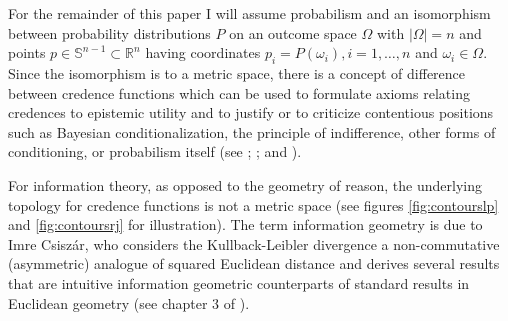 \documentclass[smallextended]{svjour3}       %
\begin{document}
For the remainder of this paper I will assume probabilism and an
isomorphism between probability distributions $P$ on an outcome space
$\Omega$ with $|\Omega|=n$ and points
$p\in\mathbb{S}^{n-1}\subset\mathbb{R}^{n}$ having coordinates
$p_{i}=P(\omega_{i}),i=1,\ldots,n$ and $\omega_{i}\in{}\Omega$. Since
the isomorphism is to a metric space, there is a concept of difference
between credence functions which can be used to formulate axioms
relating credences to epistemic utility and to justify or to criticize
contentious positions such as Bayesian conditionalization, the
principle of indifference, other forms of conditioning, or probabilism
itself (see ; ;
and ).

For information theory, as opposed to the geometry of reason, the
underlying topology for credence functions is not a metric space (see
figures \ref{fig:contourslp} and \ref{fig:contoursrj} for
illustration). The term information geometry is due to Imre
Csisz{\'a}r, who considers the Kullback-Leibler divergence a
non-commutative (asymmetric) analogue of squared Euclidean distance
and derives several results that are intuitive information geometric
counterparts of standard results in Euclidean geometry (see chapter 3
of ).
\end{document}
